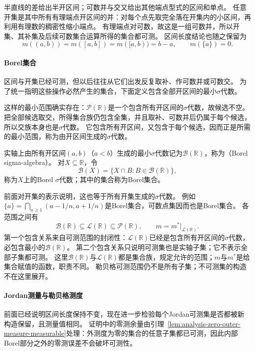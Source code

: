 半直线的差给出半开区间；可数并与交又给出其他端点型式的区间和单点。
任意开集是其中所有有理端点开区间的并：对每个点先取完全落在开集内的小区间，再利用有理数的稠密性缩小端点。
有理端点对可数，故这是一组可数并，所以开集、其补集及后续可数集合运算所得的集合都可测。
区间长度结论也随之保留为
\[
 m((a,b))=m([a,b])=m([a,b))=b-a,\qquad m(\{a\})=0.
\]

\paragraph{Borel集合}

区间与开集已经可测，但以后往往从它们出发反复取补、作可数并或可数交。
为了统一指明这些操作必然产生的集合，下面定义包含全部开区间的最小$\sigma$代数。

这样的最小范围确实存在：$\mathcal P(\mathbb R)$是一个包含所有开区间的$\sigma$代数，故候选不空。
把全部候选取交，所得集合族仍包含全集，并且取补、可数并后仍属于每个候选，所以交族本身也是$\sigma$代数。
它包含所有开区间，又包含于每个候选，因而正是所需的最小范围，称为由开区间生成的$\sigma$代数。
\begin{definition}
\label{def:analysis-borel-sigma-algebra}
实轴上由所有开区间$(a,b)$（$a<b$）生成的最小$\sigma$代数记为$\mathcal B(\mathbb R)$，称为（Borel sigma-algebra）。
对$X\subseteq\mathbb R$，令
\[
 \mathcal B(X)=\{X\cap B:B\in\mathcal B(\mathbb R)\},
\]
称为$X$上的Borel $\sigma$代数；其中的集合称为Borel集合。
\end{definition}

前面对开集的表示说明，这也等于所有开集生成的$\sigma$代数。
例如$\{a\}=\bigcap_{n\geq1}(a-1/n,a+1/n)$是Borel集合，可数点集因而也是Borel集合。
各范围之间有
\[
 \mathcal B(\mathbb R)\subseteq\mathcal L(\mathbb R)\subseteq\mathcal P(\mathbb R),
 \qquad m=m^*\big|_{\mathcal L(\mathbb R)}.
\]
第一个包含关系来自可测范围的封闭性：$\mathcal L(\mathbb R)$已经是包含所有开区间的$\sigma$代数，必包含最小的$\mathcal B(\mathbb R)$。
第二个包含关系只说明可测集也是实轴子集；它不表示全部子集都可测。
这里$\mathcal B(\mathbb R)$与$\mathcal L(\mathbb R)$都是集合族，规定允许的范围；$m$与$m^*$是给集合赋值的函数，职责不同。
勒贝格可测范围仍不是所有子集；不可测集的构造不在这里展开。

\paragraph{Jordan测量与勒贝格测度}

前面已经说明区间长度保持不变，现在进一步检验每个Jordan可测集是否都被新构造保留，且测量值相同。
证明中的零测余量由引理~\ref{lem:analysis-zero-outer-measure-measurable}处理：外测度为零的集合的任意子集都已可测，因此内部Borel部分之外的零测误差不会破坏可测性。

